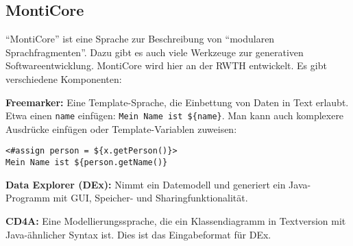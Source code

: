 \documentclass[a4paper,parskip=half*,DIV=7,fontsize=11pt]{scrartcl}
\begin{document}
\subsection{MontiCore}

``MontiCore'' ist eine Sprache zur Beschreibung von ``modularen Sprachfragmenten''. Dazu gibt es auch viele Werkzeuge zur generativen Softwareentwicklung. MontiCore wird hier an der RWTH entwickelt. Es gibt verschiedene Komponenten:

\textbf{Freemarker:} Eine Template-Sprache, die Einbettung von Daten in Text erlaubt. Etwa einen \lstinline{name} einfügen: \lstinline[mathescape=false]|Mein Name ist ${name}|. Man kann auch komplexere Ausdrücke einfügen oder Template-Variablen zuweisen: \begin{lstlisting}[mathescape=false]
<#assign person = ${x.getPerson()}>
Mein Name ist ${person.getName()}
\end{lstlisting}

\textbf{Data Explorer (DEx):} Nimmt ein Datemodell und generiert ein Java-Programm mit GUI, Speicher- und Sharingfunktionalität.

\textbf{CD4A:} Eine Modellierungssprache, die ein Klassendiagramm in Textversion mit Java-ähnlicher Syntax ist. Dies ist das Eingabeformat für DEx.

\hfill
{}
\end{document}
